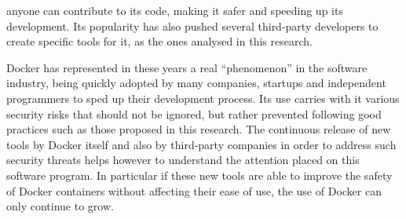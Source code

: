 \documentclass[a4paper,12pt]{article}
\begin{document}
anyone can contribute to its code, making it safer and speeding up its
development. Its popularity has also pushed several third-party developers to
create specific tools for it, as the ones analysed in this research. \par Docker
has represented in these years a real ``phenomenon'' in the software industry,
being quickly adopted by many companies, startups and independent programmers to
sped up their development process. Its use carries with it various security
risks that should not be ignored, but rather prevented following good practices
such as those proposed in this research. The continuous release of new tools by
Docker itself and also by third-party companies in order to address such
security threats helps however to understand the attention placed on this
software program. In particular if these new tools are able to improve the
safety of Docker containers without affecting their ease of use, the use of
Docker can only continue to grow.

\newpage
\end{document}
